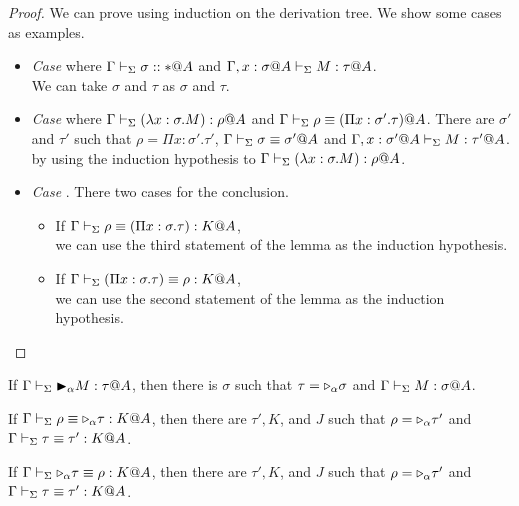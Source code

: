 \begin{proof}
	We can prove using induction on the derivation tree.
	We show some cases as examples.
				
	\begin{itemize}
		\item \textit{Case} \TAbs{} where $\Gamma\vdash_\Sigma \sigma::*@A$ and $\G,x:\sigma@A\V M:\tau@A$. \\
		      We can take $\sigma$ and $\tau$ as $\sigma$ and $\tau$. 
		      		      		      		      	      	      	      
		\item \textit{Case} \TConv{} where \(\G \V (\lambda x:\sigma.M) : \rho@A\) and \(\Gamma \vdash_\Sigma \rho \equiv (\Pi x:\sigma'.\tau)@A\).
		      There are $\sigma'$ and $\tau'$ such that
		      $\rho = \Pi x:\sigma'.\tau'$, $\Gamma \vdash_\Sigma \sigma \equiv \sigma'@A$ and $\Gamma ,x:\sigma'@A\vdash_\Sigma M:\tau'@A$.
		      by using the induction hypothesis to \(\G \V (\lambda x:\sigma.M) : \rho@A\).
		      	      	     		      	      	      	      
		\item \textit{Case} \QTRefl.
		      There two cases for the conclusion.
		      \begin{itemize}
		      	\item If $\Gamma \vdash_\Sigma \rho \equiv (\Pi x:\sigma.\tau) : K @A$,\\
		      	      we can use the third statement of the lemma as the induction hypothesis.
		      	\item If $\Gamma \vdash_\Sigma (\Pi x:\sigma.\tau) \equiv \rho : K @A$,\\
		      	      we can use the second statement of the lemma as the induction hypothesis.
		      \end{itemize}
	\end{itemize}
\end{proof}

\begin{lemma}
	\begin{item}
		  \item If $\G \V \TB_\alpha M : \tau@A$, then 
		  there is $\sigma$ such that $\tau = {\mathop{\triangleright}}_\alpha \sigma$ and $\G \V M : \sigma@A$.
	      \item If $\Gamma \vdash_\Sigma \rho \equiv {\mathop{\triangleright}}_\alpha \tau : K @A$, then there are $\tau', K$, and $J$ such that
	      $\rho = {\mathop{\triangleright}}_\alpha \tau'$ and $\Gamma \vdash_\Sigma \tau \equiv \tau' : K @A$.
	      \item If $\Gamma \vdash_\Sigma {\mathop{\triangleright}}_\alpha \tau \equiv \rho : K @A$, then there are $\tau', K$, and $J$ such that
	      $\rho = {\mathop{\triangleright}}_\alpha \tau'$ and $\Gamma \vdash_\Sigma \tau \equiv \tau' : K @A$.
	\end{item}
\end{lemma}

